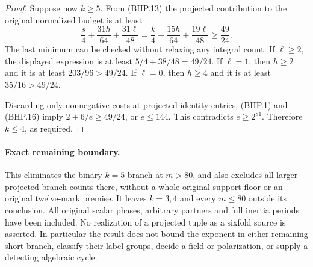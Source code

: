 \begin{proof}
Suppose now \(k\ge5\).  From (BHP.13) the projected contribution
to the original normalized budget is at least
\[
 \frac{s}{4}+\frac{31h}{64}+\frac{31\ell}{48}
       =\frac{k}{4}+\frac{15h}{64}+\frac{19\ell}{48}
       \ge\frac{49}{24}.
 \tag{BHP.16}
\]
The last minimum can be checked without relaxing any integral count.
If \(\ell\ge2\), the displayed expression is at least
\(5/4+38/48=49/24\).  If \(\ell=1\), then \(h\ge2\) and it is
at least \(203/96>49/24\).  If \(\ell=0\), then \(h\ge4\) and it
is at least \(35/16>49/24\).

Discarding only nonnegative costs at projected identity entries,
(BHP.1) and (BHP.16) imply \(2+6/e\ge49/24\), or \(e\le144\).
This contradicts \(e\ge2^{81}\).  Therefore \(k\le4\), as required.
\end{proof}

\paragraph{Exact remaining boundary.}
This eliminates the binary \(k=5\) branch at \(m>80\), and also
excludes all larger projected branch counts there, without a
whole-original support floor or an original twelve-mark premise.
It leaves \(k=3,4\) and every \(m\le80\) outside its conclusion.
All original scalar phases, arbitrary partners and full inertia
periods have been included.
No realization of a projected tuple as a sixfold source is asserted.
In particular the result does not bound the exponent in either
remaining short branch, classify their label groups, decide a
field or polarization, or supply a detecting algebraic cycle.
